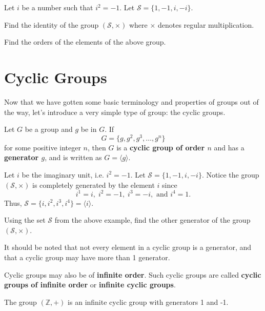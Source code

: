 \begin{exercise}
    Let $i$ be a number such that $i^2 = -1$. Let $\mathcal{S} = \{1, -1, i, -i\}$.
    \begin{partquestions}{\roman*}
        \item Find the identity of the group $(\mathcal{S}, \times)$ where $\times$ denotes regular multiplication.
        \item Find the orders of the elements of the above group.
    \end{partquestions}
\end{exercise}

\section{Cyclic Groups}
Now that we have gotten some basic terminology and properties of groups out of the way, let's introduce a very simple type of group: the cyclic groups.

\begin{definition}
    Let $G$ be a group and $g$ be in $G$. If
    \[
        G = \{g, g^2, g^3, \dots, g^n\}
    \]
    for some positive integer $n$, then $G$ is a \textbf{cyclic group of order $n$} and has a \textbf{generator $g$}, and is written as $G = \langle g \rangle$.
\end{definition}

\begin{example}
    Let $i$ be the imaginary unit, i.e. $i^2 = -1$. Let $\mathcal{S} = \{1, -1, i, -i\}$. Notice the group $(\mathcal{S}, \times)$ is completely generated by the element $i$ since
    \[
    i^1 = i,\; i^2 = -1,\; i^3 = -i, \text{ and } i^4 = 1.
    \]
    Thus, $\mathcal{S} = \{i, i^2, i^3, i^4\} = \langle i \rangle$.
\end{example}

\begin{exercise}
    Using the set $\mathcal{S}$ from the above example, find the other generator of the group $(\mathcal{S}, \times)$.
\end{exercise}

It should be noted that not every element in a cyclic group is a generator, and that a cyclic group may have more than 1 generator.

Cyclic groups may also be of \textbf{infinite order}. Such cyclic groups are called \textbf{cyclic groups of infinite order} or \textbf{infinite cyclic groups}.
\begin{example}
    The group $(\mathbb{Z}, +)$ is an infinite cyclic group with generators 1 and -1.
\end{example}

